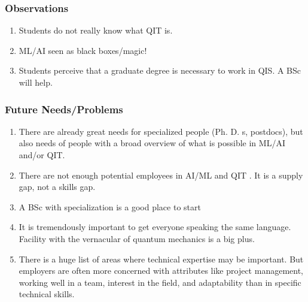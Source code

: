 \documentclass{beamer}
\begin{document}
\begin{frame}
\frametitle{Observations}

\begin{enumerate}
\item Students do not really know what QIT is.

\item ML/AI seen as black boxes/magic!

\item Students perceive that a graduate degree is necessary to work in QIS. A BSc will help.
\end{enumerate}

\noindent
\end{frame}

\begin{frame}
\frametitle{Future Needs/Problems}

\begin{enumerate}
\item There are already  great needs for specialized people (Ph. D. s, postdocs), but also needs of  people with a broad overview of what is possible in ML/AI and/or QIT.

\item There are not enough potential employees in AI/ML and QIT . It is a supply gap, not a skills gap.

\item A BSc with specialization  is a good place to start

\item It is tremendously important to get everyone speaking the same language. Facility with the vernacular of quantum mechanics is a big plus.

\item There is a huge list of areas where technical expertise may be important. But employers are often more concerned with attributes like project management, working well in a team, interest in the field, and adaptability than in specific technical skills.
\end{enumerate}

\noindent
\end{frame}
\end{document}
